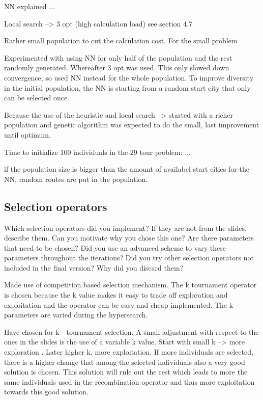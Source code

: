 \documentclass[a4paper,10pt]{article}
\newcommand{\ReplaceMe}[1]{{\color{blue}#1}}
\begin{document}
NN explained ...

Local search --> 3 opt (high calculation load) see section 4.7

Rather small population to cut the calculation cost. For the small problem

Experimented with using NN for only half of the population and the rest randomly generated. Whereafter 3 opt was used. This only slowed down convergence, so used NN instead for the whole population. To improve diversity in the initial population, the NN is starting from a random start city that only can be selected once. 


Because the use of the heuristic and local search --> started with a richer population and genetic algorithm was expected to do the small, last improvement until optimum. 

Time to initialize $100$ individuals in the 29 tour problem: ...


if the population size is bigger than the amount of availabel start cities for the NN, random routes are put in the population. 

\subsection{Selection operators}

\ReplaceMe{Which selection operators did you implement? If they are not from the slides, describe them. Can you motivate why you chose this one? Are there parameters that need to be chosen? Did you use an advanced scheme to vary these parameters throughout the iterations? Did you try other selection operators not included in the final version? Why did you discard them?}

Made use of competition based selection mechanism. The k tournament operator is chosen because the k value makes it easy to trade off exploration and exploitation and the operator can be easy and cheap implemented. The k -parameters are varied during the hypersearch. 

Have chosen for k - tournament selection. A small adjustment with respect to the ones in the slides is the use of a variable k value. Start with small k --> more exploration . Later higher k, more exploitation. If more individuals are selected, there is a higher change that among the selected individuals also a very good solution is chosen. This solution will rule out the rest which leads to more the same individuals used in the recombination operator and thus more exploitation towards this good solution. 
\end{document}
